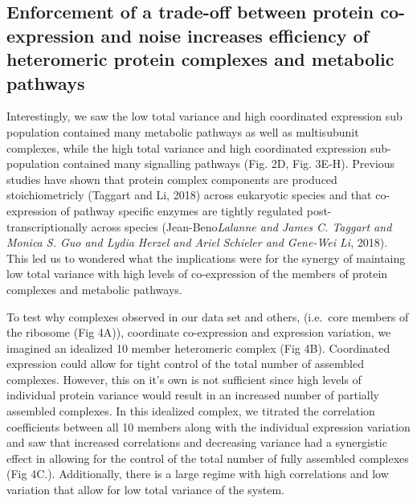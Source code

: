 \documentclass[11pt,]{article}
\begin{document}
\hypertarget{enforcement-of-a-trade-off-between-protein-co-expression-and-noise-increases-efficiency-of-heteromeric-protein-complexes-and-metabolic-pathways}{%
\subsection{Enforcement of a trade-off between protein co-expression and
noise increases efficiency of heteromeric protein complexes and
metabolic
pathways}\label{enforcement-of-a-trade-off-between-protein-co-expression-and-noise-increases-efficiency-of-heteromeric-protein-complexes-and-metabolic-pathways}}

Interestingly, we saw the low total variance and high coordinated
expression sub population contained many metabolic pathways as well as
multisubunit complexes, while the high total variance and high
coordinated expression sub-population contained many signalling pathways
(Fig. 2D, Fig. 3E-H). Previous studies have shown that protein complex
components are produced stoichiometricly (Taggart and Li, 2018) across
eukaryotic species and that co-expression of pathway specific enzymes
are tightly regulated post-transcriptionally across species
(Jean-Beno\emph{Lalanne and James C. Taggart and Monica S. Guo and Lydia
Herzel and Ariel Schieler and Gene-Wei Li}, 2018). This led us to
wondered what the implications were for the synergy of maintaing low
total variance with high levels of co-expression of the members of
protein complexes and metabolic pathways.

To test why complexes observed in our data set and others, (i.e.~core
members of the ribosome (Fig 4A)), coordinate co-expression and
expression variation, we imagined an idealized 10 member heteromeric
complex (Fig 4B). Coordinated expression could allow for tight control
of the total number of assembled complexes. However, this on it's own is
not sufficient since high levels of individual protein variance would
result in an increased number of partially assembled complexes. In this
idealized complex, we titrated the correlation coefficients between all
10 members along with the individual expression variation and saw that
increased correlations and decreasing variance had a synergistic effect
in allowing for the control of the total number of fully assembled
complexes (Fig 4C.). Additionally, there is a large regime with high
correlations and low variation that allow for low total variance of the
system.
\end{document}
